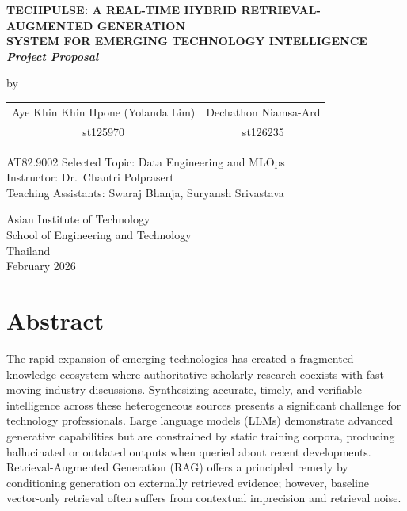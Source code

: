 \documentclass[12pt,a4paper]{report}
\begin{document}

\begin{titlepage}
\begin{center}
\vspace*{0.5cm}
{\fontsize{14}{18}\bfseries\MakeUppercase{%
TechPulse: A Real-Time Hybrid Retrieval-Augmented Generation\\
System for Emerging Technology Intelligence}\\[4pt]
\normalsize\mdseries\textit{Project Proposal}}

\vspace{1.8cm}
{\normalsize by}

    \vspace{1em}

    \begin{tabular}{cc}
        Aye Khin Khin Hpone (Yolanda Lim) & Dechathon Niamsa-Ard \\
        {\small st125970} & {\small st126235}
    \end{tabular}

\vfill

{\normalsize AT82.9002 Selected Topic: Data Engineering and MLOps}\\[6pt]
{\normalsize Instructor: Dr.\ Chantri Polprasert}\\[4pt]
{\normalsize Teaching Assistants: Swaraj Bhanja, Suryansh Srivastava}

\vfill
{\normalsize
Asian Institute of Technology\\[4pt]
School of Engineering and Technology\\[4pt]
Thailand\\[8pt]
February 2026
}
\end{center}
\end{titlepage}

\chapter*{Abstract}

The rapid expansion of emerging technologies has created a fragmented knowledge ecosystem where authoritative scholarly research coexists with fast-moving industry discussions. Synthesizing accurate, timely, and verifiable intelligence across these heterogeneous sources presents a significant challenge for technology professionals. Large language models (LLMs) demonstrate advanced generative capabilities but are constrained by static training corpora, producing hallucinated or outdated outputs when queried about recent developments. Retrieval-Augmented Generation (RAG) offers a principled remedy by conditioning generation on externally retrieved evidence; however, baseline vector-only retrieval often suffers from contextual imprecision and retrieval noise.
\end{document}
